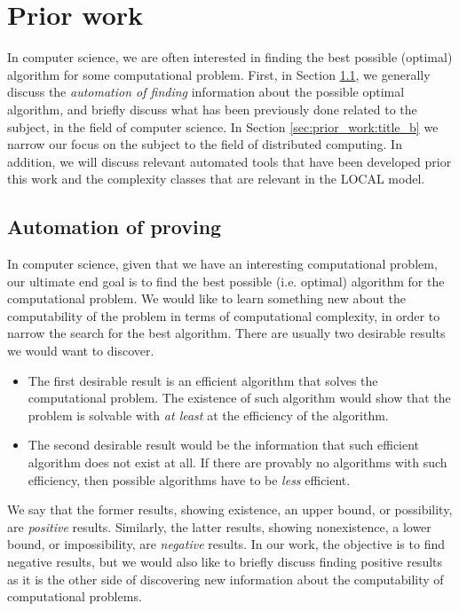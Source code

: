 
\section{Prior work} \label{sec:prior_work}
In computer science, we are often interested in finding the best possible (optimal) algorithm for some computational problem.
First, in Section \ref{sec:prior_work:title_a}, we generally discuss the \emph{automation of finding} information about the possible optimal algorithm, and briefly discuss what has been previously done related to the subject, in the field of computer science.
In Section \ref{sec:prior_work:title_b} we narrow our focus on the subject to the field of distributed computing.
In addition, we will discuss relevant automated tools that have been developed prior this work and the complexity classes that are relevant in the LOCAL model.

\subsection{Automation of proving} \label{sec:prior_work:title_a} %
In computer science, given that we have an interesting computational problem, our ultimate end goal is to find the best possible (i.e. optimal) algorithm for the computational problem.
We would like to learn something new about the computability of the problem in terms of computational complexity, in order to narrow the search for the best algorithm.
There are usually two desirable results we would want to discover.
\begin{itemize}
    \item
    The first desirable result is an efficient algorithm that solves the computational problem.
    The existence of such algorithm would show that the problem is solvable with \emph{at least} at the efficiency of the algorithm.
    \item
    The second desirable result would be the information that such efficient algorithm does not exist at all.
    If there are provably no algorithms with such efficiency, then possible algorithms have to be \emph{less} efficient.
\end{itemize}
We say that the former results, showing existence, an upper bound, or possibility, are \emph{positive} results.
Similarly, the latter results, showing nonexistence, a lower bound, or impossibility, are \emph{negative} results.
In our work, the objective is to find negative results, but we would also like to briefly discuss finding positive results as it is the other side of discovering new information about the computability of computational problems.

